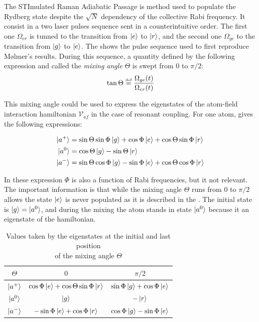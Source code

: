 \documentclass[%
]{scrreprt}
\newcommand{\defi}{\xspace\ensuremath{\overset{\text{\tiny def}}{=}}\xspace}
\newcommand{\ff}{\ensuremath{\ket{g}}\xspace}
\newcommand{\ee}{\ensuremath{\ket{e}}\xspace}
\newcommand{\rr}{\ensuremath{\ket{r}}\xspace}
\newcommand{\Om}{\Omega}
\newcommand{\mc}[1]{\mathcal{#1}}
\newcommand{\Th}{\Theta}
\begin{document}
\par The STImulated Raman Adiabatic Passage is method used to populate the Rydberg state despite the $\sqrt{N}$ dependency of the collective Rabi frequency. It consist in a two laser pulses sequence sent in a counterintuitive order. The first one $\Om_{er}$ is tunned to the transition from \ee to \rr, and the second one $\Om_{ge}$ to the transition from \ff to \ee. The  shows the pulse sequence used to first reproduce Mølmer's results. During this sequence, a quantity defined by the following expression and called the \emph{mixing angle} $\Theta$ is swept from $0$ to $\pi/2$: \[ \tan \Theta \defi \frac{\Om_{ge}(t)}{\Om_{er}(t)} \]

\par This mixing angle could be used to express the eigenstates of the atom-field interaction hamiltonian $\mc{V}_{af}$ in the case of resonant coupling. For one atom, \cite{Berg} gives the following expressions: 

\begin{align*}
\ket{a^+} &= \sin \Th \sin \Phi \ff + \cos \Phi \ee + \cos \Th \sin \Phi \rr \\
\ket{a^0} &= \cos \Th \ff - \sin \Th \rr \\
\ket{a^-} &= \sin \Th \cos \Phi \ff - \sin \Phi \ee + \cos \Th \cos \Phi \rr
\end{align*}

\par In these expression $\Phi$ is also a function of Rabi frequencies, but it not relevant. The important information is that while the mixing angle $\Th$ runs from $0$ to $\pi/2$ allows the state \ee is never populated as it is described in the . The initial state is $\ff = \ket{a^0}$, and during the mixing the atom stands in state $\ket{a^0}$ because it an eigenstate of the hamiltonian.

\begin{table}[h]
  \centering
  \begin{tabular}{||c||c c||}
    \hline
    $\Th$ & $0$ & $\pi/2$\\
    \hline \hline
    $\ket{a^+}$ & $\cos \Phi \ee + \cos \Th \sin \Phi \rr$ & $\sin \Phi \ff + \cos \Phi \ee$\\
    $\ket{a^0}$ & $\ff$ & $-\rr$\\
    $\ket{a^-}$ & $- \sin \Phi \ee + \cos \Phi \rr$ & $\cos \Phi \ff - \sin \Phi \ee$\\
    \hline
  \end{tabular}
  \caption{\label{sweeping} Values taken by the eigenstates at the initial and last position \\ of the mixing angle $\Th$}
\end{table}
\end{document}
